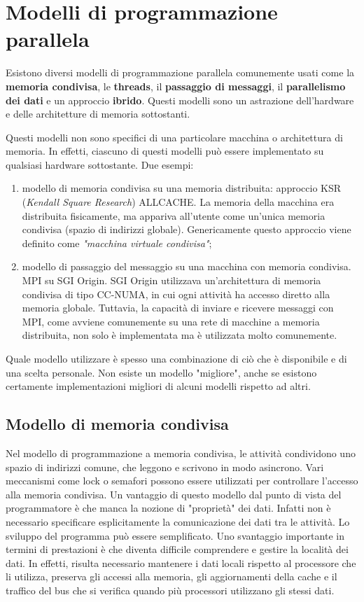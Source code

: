 \section{Modelli di programmazione parallela}
Esistono diversi modelli di programmazione parallela comunemente usati come la \textbf{memoria condivisa}, le \textbf{threads}, il \textbf{passaggio di messaggi}, il \textbf{parallelismo dei dati} e un approccio \textbf{ibrido}. Questi modelli sono un astrazione dell'hardware e delle architetture di memoria sottostanti.

Questi modelli non sono specifici di una particolare macchina o architettura di memoria. In effetti, ciascuno di questi modelli può essere implementato su qualsiasi hardware sottostante. Due esempi:
\begin{enumerate}
	\item modello di memoria condivisa su una memoria distribuita: approccio KSR (\textit{Kendall Square Research}) ALLCACHE. La memoria della macchina era distribuita fisicamente, ma appariva all'utente come un'unica memoria condivisa (spazio di indirizzi globale). Genericamente questo approccio viene definito come \textit{"macchina virtuale condivisa"};
	\item modello di passaggio del messaggio su una macchina con memoria condivisa. MPI su SGI Origin. SGI Origin utilizzava un'architettura di memoria condivisa di tipo CC-NUMA, in cui ogni attività ha accesso diretto alla memoria globale. Tuttavia, la capacità di inviare e ricevere messaggi con MPI, come avviene comunemente su una rete di macchine a memoria distribuita, non solo è implementata ma è utilizzata molto comunemente.
\end{enumerate}

Quale modello utilizzare è spesso una combinazione di ciò che è disponibile e di una scelta personale. Non esiste un modello "migliore", anche se esistono certamente implementazioni migliori di alcuni modelli rispetto ad altri.

\subsection{Modello di memoria condivisa} Nel modello di programmazione a memoria condivisa, le attività condividono uno spazio di indirizzi comune, che leggono e scrivono in modo asincrono. Vari meccanismi come lock o semafori possono essere utilizzati per controllare l'accesso alla memoria condivisa. Un vantaggio di questo modello dal punto di vista del programmatore è che manca la nozione di "proprietà" dei dati. Infatti non è necessario specificare esplicitamente la comunicazione dei dati tra le attività. Lo sviluppo del programma può essere semplificato. Uno svantaggio importante in termini di prestazioni è che diventa difficile comprendere e gestire la località dei dati. In effetti, risulta necessario mantenere i dati locali rispetto al processore che li utilizza, preserva gli accessi alla memoria, gli aggiornamenti della cache e il traffico del bus che si verifica quando più processori utilizzano gli stessi dati.

